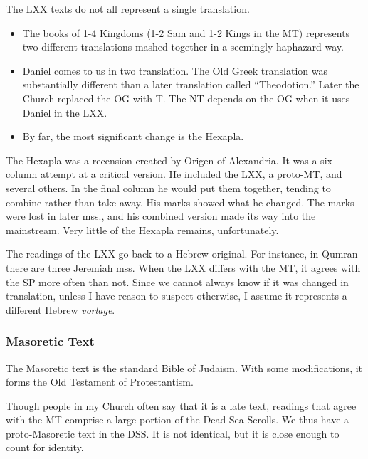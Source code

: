 \documentclass{beamer}
\begin{document}
\begin{frame}
  The LXX texts do not all represent a single translation.\pause
  \begin{itemize}
	\item The books of 1-4 Kingdoms (1-2 Sam and 1-2 Kings in the MT) represents two different translations mashed together in a seemingly haphazard way.\pause
	\item Daniel comes to us in two translation.
	  The Old Greek translation was substantially different than a later translation called ``Theodotion.''
	  Later the Church replaced the OG with T.
	  The NT depends on the OG when it uses Daniel in the LXX.\pause
	\item By far, the most significant change is the Hexapla.
  \end{itemize}
\end{frame}

\begin{frame}
  The Hexapla was a recension created by Origen of Alexandria.
  It was a six-column attempt at a critical version.
  He included the LXX, a proto-MT, and several others.
  In the final column he would put them together, tending to combine rather than take away.
  His marks showed what he changed.
  The marks were lost in later mss., and his combined version made its way into the mainstream.
  Very little of the Hexapla remains, unfortunately.
\end{frame}

\begin{frame}
  The readings of the LXX go back to a Hebrew original.
  For instance, in Qumran there are three Jeremiah mss.
  When the LXX differs with the MT, it agrees with the SP more often than not.
  Since we cannot always know if it was changed in translation, unless I have reason to suspect otherwise, I assume it represents a different Hebrew \emph{vorlage}.
\end{frame}

\subsubsection{Masoretic Text}

\begin{frame}
  The Masoretic text is the standard Bible of Judaism.
  With some modifications, it forms the Old Testament of Protestantism.
\end{frame}

\begin{frame}
  Though people in my Church often say that it is a late text, readings that agree with the MT comprise a large portion of the Dead Sea Scrolls.
  We thus have a proto-Masoretic text in the DSS.
  It is not identical, but it is close enough to count for identity.
\end{frame}
\end{document}

